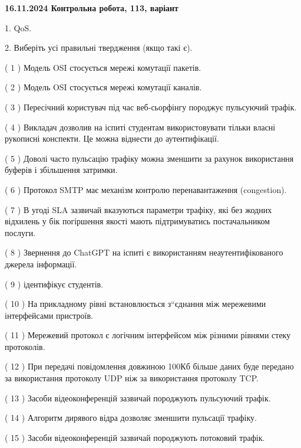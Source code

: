 \documentclass[12pt, ukrainian]{article}
\begin{document}
\vspace{4mm}
\newpage
\begin {large}

\textbf{16.11.2024 Контрольна робота, 113, варіант  }\par


{
1. QoS.



\vspace{5mm}
2. Виберіть усі правильні твердження (якщо такі є).\par
\vspace{2mm}

( 1 ) Модель OSI стосується мережі комутації пакетів.

( 2 ) Модель OSI стосується мережі комутації каналів.

( 3 ) Пересічний користувач під час веб-сьорфінгу породжує пульсуючий трафік.

( 4 ) Викладач дозволив на іспиті студентам використовувати тільки власні рукописні конспекти. Це можна віднести до аутентифікації.

( 5 ) Доволі часто пульсацію трафіку можна зменшити за рахунок використання буферів і збільшення затримки.

( 6 ) Протокол SMTP має механізм контролю перенавантаження (congestion).

( 7 ) В угоді SLA зазвичай вказуються параметри трафіку, які без жодних відхилень у бік погіршення якості мають підтримуватись постачальником послуги.

( 8 ) Звернення до ChatGPT на іспиті є використанням неаутентифікованого джерела інформації.

( 9 ) ідентифікує студентів.

( 10 ) На прикладному рівні встановлюється з“єднання між мережевими інтерфейсами пристроїв.

( 11 ) Мережевий протокол є логічним інтерфейсом між різними рівнями стеку протоколів.

( 12 ) При передачі повідомлення довжиною 100Кб більше даних буде передано за використання протоколу UDP ніж за використання протоколу TCP.

( 13 ) Засоби відеоконференцій зазвичай породжують пульсуючий трафік.

( 14 ) Алгоритм дирявого відра дозволяє зменшити пульсації трафіку.

( 15 ) Засоби відеоконференцій зазвичай породжують потоковий трафік.
}
\end {large}
\end{document}
